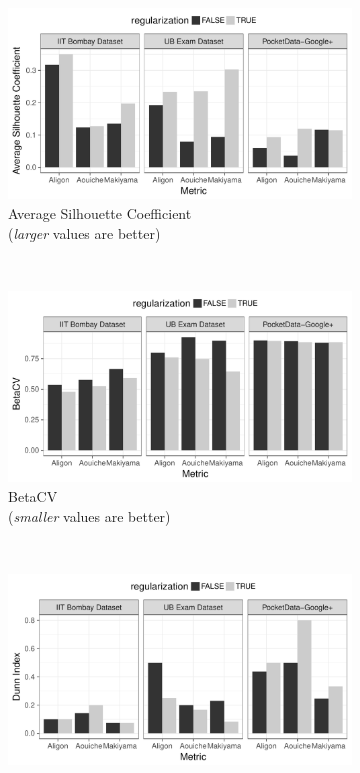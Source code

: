 \begin{figure}[h!]
	\captionsetup[subfigure]{justification=centering}
    \centering
    \begin{subfigure}[b]{0.48\textwidth}%
        \centering
        \includegraphics[width=\textwidth]{TKDE-QuerySimilarity/graphics/compare_silhouette}
        \caption{Average Silhouette Coefficient\\(\textit{larger} values are better)}
    \end{subfigure}%
    ~
    \begin{subfigure}[b]{0.48\textwidth}%
        \centering
        \includegraphics[width=\textwidth]{TKDE-QuerySimilarity/graphics/compare_betacv}
        \caption{BetaCV\\(\textit{smaller} values are better)}
    \end{subfigure}
    ~
    \begin{subfigure}[b]{0.48\textwidth}%
        \centering
        \includegraphics[width=\textwidth]{TKDE-QuerySimilarity/graphics/compare_dunn}

\end{subfigure}
\end{figure}
